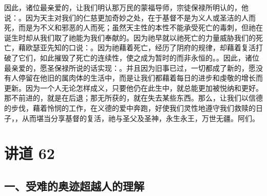 因此，诸位最亲爱的，让我们明认那万民的蒙福导师，宗徒保禄所明认的，他说：。因为天主对我们的仁慈更加奇妙之处，在于基督不是为义人或圣洁的人而死，而是为不义和邪恶的人而死；虽然天主性的本性不能承受死亡的毒刺，但祂在诞生时却从我们取了祂能为我们奉献的。因为祂早就以祂死亡的力量威胁我们的死亡，藉欧瑟亚先知的口说：。因为祂藉着死亡，经历了阴府的规律，却藉着复活打破了它们，如此摧毁了死亡的连续性，使之成为暂时的而非永恒的。。因此，诸位最亲爱的，愿圣保禄所说的话实现：。并且因为旧事已过，一切都成了新的，愿没有人停留在他旧的属肉体的生活中，而是让我们都藉着每日的进步和虔敬的增长而更新。因为一个人无论怎样成义，只要他仍在此生中，就总能更加被悦纳和更好。那不前进的，就是在后退；那无所获的，就在失去某些东西。那么，让我们以信德的步伐，藉着怜悯的工作，在义德的爱中奔跑，好使我们灵性地遵守我们救赎的日子，，从而堪当分享基督的复活，祂与圣父及圣神，永生永王，万世无疆。阿们。\par



\section{讲道 62}

\par


\subsection{一、受难的奥迹超越人的理解}

